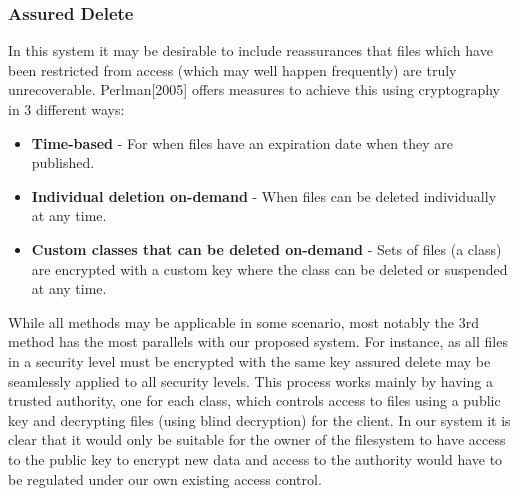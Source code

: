 \documentclass[10pt, titlepage]{article}
\begin{document}
\subsubsection{Assured Delete}
In this system it may be desirable to include reassurances that files which have been restricted from access (which may well happen frequently) are truly unrecoverable. Perlman[2005]\cite{delete} offers measures to achieve this using cryptography in 3 different ways:
\begin{itemize}
\item \textbf{Time-based} - For when files have an expiration date when they are published.
\item \textbf{Individual deletion on-demand} - When files can be deleted individually at any time.
\item \textbf{Custom classes that can be deleted on-demand} - Sets of files (a class) are encrypted with a custom key where the class can be deleted or suspended at any time.
\end{itemize}
While all methods may be applicable in some scenario, most notably the 3rd method has the most parallels with our proposed system. For instance, as all files in a security level must be encrypted with the same key assured delete may be seamlessly applied to all security levels.
\newline \indent This process works mainly by having a trusted authority, one for each class, which controls access to files using a public key and decrypting files (using blind decryption) for the client. In our system it is clear that it would only be suitable for the owner of the filesystem to have access to the public key to encrypt new data and access to the authority would have to be regulated under our own existing access control.
\end{document}
